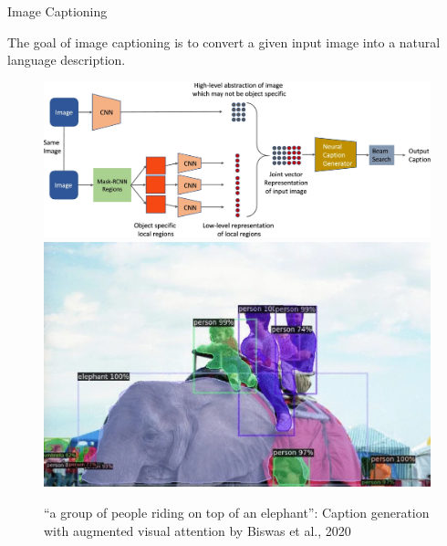 \begin{vbframe}{Image Captioning}

The goal of image captioning is to convert a given input image into a natural language description.

\begin{figure}
\centering
\begin{minipage}{.65\textwidth}
  \centering
  \includegraphics[width=.9\linewidth]{figure/caption_generation.png}
  \caption\tiny{}
\end{minipage}%
\begin{minipage}{.35\textwidth}
  \centering
  \includegraphics[width=.9\linewidth]{figure/example_sample_generation.png}
\end{minipage}
\caption\tiny{ “a group of people riding on top of an elephant”: Caption generation with augmented visual attention by Biswas et al., 2020 }
\end{figure}

\end{vbframe}


